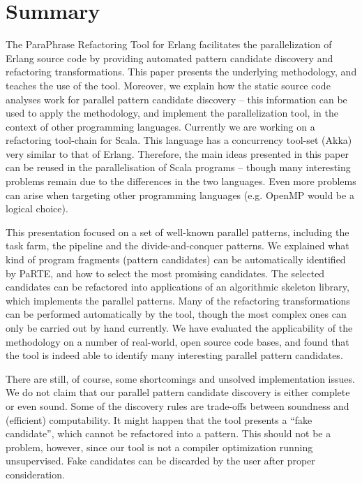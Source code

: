 \documentclass[sigconf]{acmart}
\begin{document}
\section{Summary}

The ParaPhrase Refactoring Tool for Erlang facilitates the parallelization
of Erlang source code by providing automated pattern candidate discovery and
refactoring transformations. This paper presents the underlying methodology,
and teaches the use of the tool. Moreover, we explain how the static source
code analyses work for parallel pattern candidate discovery -- this information
can be used to apply the methodology, and implement the parallelization tool,
in the context of other programming languages. Currently we are working on
a refactoring tool-chain for Scala. This language has a concurrency tool-set (Akka)
very similar to that of Erlang. Therefore, the main ideas presented in this
paper can be reused in the parallelisation of Scala programs -- though many interesting
problems remain due to the differences in the two languages. Even more
problems can arise when targeting other programming languages (e.g. OpenMP
would be a logical choice).

This presentation focused on a set of well-known parallel patterns, including
the task farm, the pipeline and the divide-and-conquer patterns. We explained
what kind of program fragments (pattern candidates) can be automatically
identified by PaRTE, and how to select the most promising candidates.
The selected candidates can be refactored into
applications of an algorithmic skeleton library, which implements the
parallel patterns. Many of the refactoring transformations can be performed
automatically by the tool, though the most complex ones can only be carried
out by hand currently. We have evaluated the applicability of the methodology
on a number of real-world, open source code bases, and found that the tool
is indeed able to identify many interesting parallel pattern candidates.

There are still, of course, some shortcomings and unsolved implementation
issues. We do not claim that our parallel pattern candidate discovery is
either complete or even sound. Some of the discovery rules are trade-offs
between soundness and (efficient) computability. It might happen that the
tool presents a ``fake candidate'', which cannot be refactored into a pattern.
This should not be a problem, however, since our tool is not a compiler
optimization running unsupervised. Fake candidates can be discarded by the
user after proper consideration.
\end{document}
